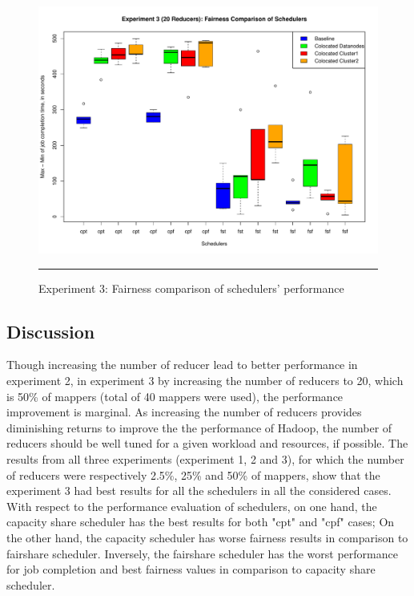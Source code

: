  
  

\begin{figure}[htbp]
  \centering
    \includegraphics[width=\textwidth,height=\textheight,keepaspectratio]{./Figures/exp_3_max-min.pdf}
    \rule{35em}{0.5pt}
  \caption{Experiment 3: Fairness comparison of schedulers' performance }
  \label{fig:exp_3_max-min}
\end{figure}

\subsection{Discussion}
Though increasing the number of reducer lead to better performance in experiment 2, in experiment 3 by increasing the number of reducers to 20, which is 50\% of mappers (total of 40 mappers were used), the performance improvement is marginal. As increasing the number of reducers provides diminishing returns to improve the the performance of Hadoop, the number of reducers should be well tuned for a given workload and resources, if possible. The results from all three experiments (experiment 1, 2 and 3), for which the number of reducers were respectively 2.5\%, 25\% and 50\% of mappers, show that the experiment 3 had best results for all the schedulers in all the considered cases.\\


With respect to the performance evaluation of schedulers, on one hand, the capacity share scheduler has the best results for both "cpt" and "cpf" cases; On the other hand, the capacity scheduler has worse fairness results in comparison to fairshare scheduler. Inversely, the fairshare scheduler has the worst performance for job completion and best fairness values in comparison to capacity share scheduler. \\

